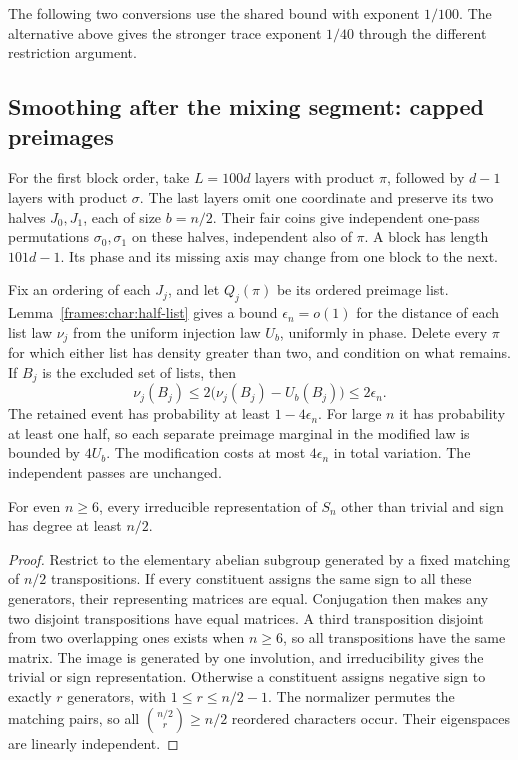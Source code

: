 The following two conversions use the shared bound with exponent
$1/100$. The alternative above gives the stronger trace exponent
$1/40$ through the different restriction argument.

\subsection{Smoothing after the mixing segment: capped preimages}
\label{frames:char:smoothing}

For the first block order, take $L=100d$ layers with product $\pi$,
followed by $d-1$ layers with product $\sigma$. The last layers omit
one coordinate and preserve its two halves $J_0,J_1$, each of size
$b=n/2$. Their fair coins give independent one-pass permutations
$\sigma_0,\sigma_1$ on these halves, independent also of $\pi$.
A block has length $101d-1$. Its phase and its missing axis may change
from one block to the next.

Fix an ordering of each $J_j$, and let $Q_j(\pi)$ be its ordered
preimage list. Lemma~\ref{frames:char:half-list} gives a bound
$\epsilon_n=o(1)$ for the distance of each list law $\nu_j$ from the
uniform injection law $U_b$, uniformly in phase. Delete every $\pi$
for which either list has density greater than two, and condition on
what remains. If $B_j$ is the excluded set of lists, then
\[
 \nu_j(B_j)\le2\bigl(\nu_j(B_j)-U_b(B_j)\bigr)\le2\epsilon_n.
\]
The retained event has probability at least $1-4\epsilon_n$. For large
$n$ it has probability at least one half, so each separate preimage
marginal in the modified law is bounded by $4U_b$. The modification
costs at most $4\epsilon_n$ in total variation. The independent passes
are unchanged.

\begin{lemma}\label{frames:char:minimum-degree}
For even $n\ge6$, every irreducible representation of $S_n$ other than
trivial and sign has degree at least $n/2$.
\end{lemma}
\begin{proof}
Restrict to the elementary abelian subgroup generated by a fixed matching
of $n/2$ transpositions. If every constituent assigns the same sign to
all these generators, their representing matrices are equal. Conjugation
then makes any two disjoint transpositions have equal matrices. A third
transposition disjoint from two overlapping ones exists when $n\ge6$,
so all transpositions have the same matrix. The image is generated by
one involution, and irreducibility gives the trivial or sign representation.
Otherwise a constituent assigns negative sign to exactly $r$ generators,
with $1\le r\le n/2-1$. The normalizer permutes the matching pairs,
so all $\binom{n/2}{r}\ge n/2$ reordered characters occur. Their
eigenspaces are linearly independent.
\end{proof}

